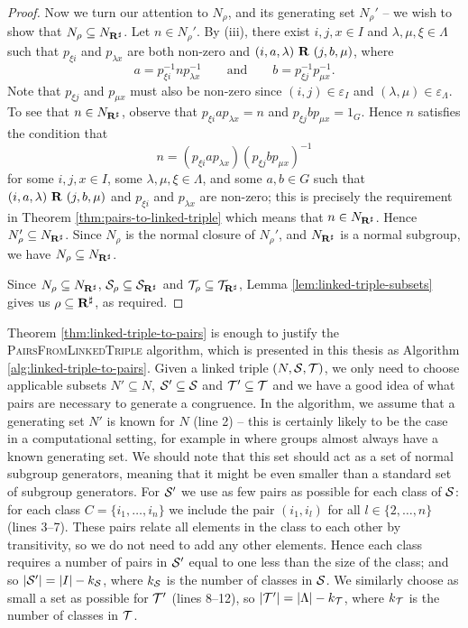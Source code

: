 \begin{theorem}
\begin{proof}
    Now we turn our attention to $N_\rho$, and its generating set $N_\rho'$ -- we
    wish to show that $N_\rho \subseteq N_{\mathbf{R}^\sharp}$.  Let $n \in N_\rho'$.  By (iii),
    there exist $i, j, x \in I$ and $\lambda, \mu, \xi \in \Lambda$ such that
    $p_{\xi i}$ and $p_{\lambda x}$ are both non-zero and
    $(i, a, \lambda) ~\mathbf{R}~ (j, b, \mu)$, where
    $$a = p_{\xi i}^{-1} n p_{\lambda x}^{-1} \qquad \text{and} \qquad
    b = p_{\xi j}^{-1} p_{\mu x}^{-1}.$$
    Note that $p_{\xi j}$ and $p_{\mu x}$
    must also be non-zero since $(i, j) \in \varepsilon_I$ and
    $(\lambda, \mu) \in \varepsilon_\Lambda$.  To see that $n \in N_{\mathbf{R}^\sharp}$, observe
    that $p_{\xi i} a p_{\lambda x} = n$ and $p_{\xi j} b p_{\mu x} = 1_G$.
    Hence $n$ satisfies the condition that
    $$n = (p_{\xi i} a p_{\lambda x}) (p_{\xi j} b p_{\mu x})^{-1}$$
    for some $i,j,x \in I$, some $\lambda, \mu, \xi \in \Lambda$, and some
    $a,b \in G$ such that $(i,a,\lambda) ~\mathbf{R}~ (j,b,\mu)$ and $p_{\xi i}$
    and $p_{\lambda x}$ are non-zero; this is precisely the requirement in
    Theorem \ref{thm:pairs-to-linked-triple} which means that $n \in N_{\mathbf{R}^\sharp}$.
    Hence $N_\rho' \subseteq N_{\mathbf{R}^\sharp}$.  Since $N_\rho$ is the normal closure of
    $N_\rho'$, and $N_{\mathbf{R}^\sharp}$ is a normal subgroup, we have $N_\rho \subseteq N_{\mathbf{R}^\sharp}$.

    Since $N_\rho \subseteq N_{\mathbf{R}^\sharp}$, $\mathcal{S}_\rho \subseteq \mathcal{S}_{\mathbf{R}^\sharp}$ and
    $\mathcal{T}_\rho \subseteq \mathcal{T}_{\mathbf{R}^\sharp}$, Lemma \ref{lem:linked-triple-subsets} gives us
    $\rho \subseteq \mathbf{R}^\sharp$, as required.
  \end{proof}
\end{theorem}

Theorem \ref{thm:linked-triple-to-pairs} is enough to justify the
\textsc{PairsFromLinkedTriple} algorithm, which is presented in this
thesis as Algorithm \ref{alg:linked-triple-to-pairs}.  Given a linked triple
$(N, \mathcal{S}, \mathcal{T})$, we only need to choose applicable subsets $N' \subseteq N$,
$\mathcal{S}' \subseteq \mathcal{S}$ and $\mathcal{T}' \subseteq \mathcal{T}$ and we have a
good idea of what pairs are necessary to generate a congruence.  In the
algorithm, we assume that a generating set $N'$ is known for $N$ (line 2) -- this is
certainly likely to be the case in a computational setting, for example in \GAP{}
\cite{gap} where groups almost always have a known generating set.  We should
note that this set should act as a set of normal subgroup generators, meaning
that it might be even smaller than a standard set of subgroup generators.  For
$\mathcal{S}'$ we use as few pairs as possible for each class of $\mathcal{S}$: for each class
$C = \{i_1, \ldots, i_n\}$ we include the pair $(i_1, i_l)$ for all $l \in
\{2, \ldots, n\}$ (lines 3--7).  These pairs relate all elements in the class to
each other by transitivity, so we do not need to add any other elements.
Hence each class requires a number of pairs in $\mathcal{S}'$ equal to one less than the
size of the class; and so $|\mathcal{S}'| = |I| - k_{\mathcal{S}}$, where $k_{\mathcal{S}}$ is the number
of classes in $\mathcal{S}$.  We similarly choose as small a set as possible for
$\mathcal{T}'$ (lines 8--12), so $|\mathcal{T}'| = |\Lambda| - k_{\mathcal{T}}$, where $k_{\mathcal{T}}$ is
the number of classes in $\mathcal{T}$.

